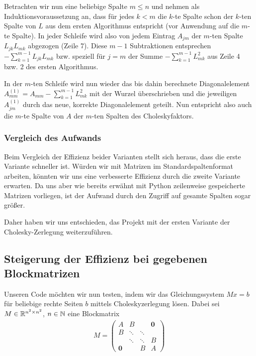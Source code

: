 Betrachten wir nun eine beliebige Spalte $m \leq n$ und nehmen als Induktionsvoraussetzung an, dass für jedes $k < m$ die $k$-te Spalte schon der $k$-ten Spalte von $L$ aus dem ersten Algorithmus entspricht (vor Anwendung auf die $m$-te Spalte). In jeder Schleife wird also von jedem Eintrag $A_{jm}$ der $m$-ten Spalte $L_{jk}L_{mk}$ abgezogen (Zeile 7). Diese $m-1$ Subtraktionen entsprechen $-\sum_{k=1}^{m-1}L_{jk}L_{mk}$ bzw. speziell für $j=m$ der Summe $-\sum_{k=1}^{m-1}L_{mk}^{2}$ aus Zeile 4 bzw. 2 des ersten Algorithmus.

In der $m$-ten Schleife wird nun wieder das bis dahin berechnete Diagonalelement $A_{mm}^{(1)} = A_{mm}-\sum_{k=1}^{m-1}L_{mk}^{2}$ mit der Wurzel überschrieben und die jeweiligen $A_{jm}^{(1)}$ durch das neue, korrekte Diagonalelement geteilt. Nun entspricht also auch die $m$-te Spalte von $A$ der $m$-ten Spalten des Choleskyfaktors.


\subsubsection{Vergleich des Aufwands}
Beim Vergleich der Effizienz beider Varianten stellt sich heraus, dass die erste Variante schneller ist. Würden wir mit Matrizen im Standardspaltenformat arbeiten, könnten wir uns eine verbesserte Effizienz durch die zweite Variante erwarten. Da uns aber wie bereits erwähnt mit Python zeilenweise gespeicherte Matrizen vorliegen, ist der Aufwand durch den Zugriff auf gesamte Spalten sogar größer.

Daher haben wir uns entschieden, das Projekt mit der ersten Variante der Cholesky-Zerlegung weiterzuführen.

\subsection{Steigerung der Effizienz bei gegebenen Blockmatrizen}

Unseren Code möchten wir nun testen, indem wir das Gleichungssystem $Mx=b$ für beliebige rechte Seiten $b$ mittels Choleskyzerlegung lösen. Dabei sei $M \in \mathbb{R}^{n^{2} \times n^{2}}$, $n \in \mathbb{N}$ eine Blockmatrix
\begin{align*}
    M = \left(\begin{array}{cccccc}
                A & B && \boldsymbol{0} \\
                B & \ddots & \ddots & \\
                & \ddots & \ddots & B \\
                \boldsymbol{0} && B & A
           \end{array}
     \right)
\end{align*}

